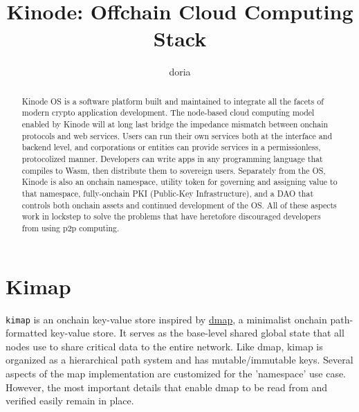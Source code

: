 \documentclass[runningheads]{llncs}
\begin{document}
%
\title{Kinode: Offchain Cloud Computing Stack}
%
%
\author{doria %
}
%
%
\institute{ }
%
\maketitle              %
%
\begin{abstract}
Kinode OS is a software platform built and maintained to integrate all the facets of modern crypto application development.
The node-based cloud computing model enabled by Kinode will at long last bridge the impedance mismatch between onchain protocols and web services.
Users can run their own services both at the interface and backend level, and corporations or entities can provide services in a permissionless, protocolized manner.
Developers can write apps in any programming language that compiles to Wasm, then distribute them to sovereign users.
Separately from the OS, Kinode is also an onchain namespace, utility token for governing and assigning value to that namespace, fully-onchain PKI (Public-Key Infrastructure), and a DAO that controls both onchain assets and continued development of the OS.
All of these aspects work in lockstep to solve the problems that have heretofore discouraged developers from using p2p computing.

\end{abstract}
%
%
%
\tableofcontents
\newpage
%
%
%
\section{Kimap}
\verb|kimap| is an onchain key-value store inspired by \href{https://github.com/dapphub/dmap}{dmap}, a minimalist onchain path-formatted key-value store.
It serves as the base-level shared global state that all nodes use to share critical data to the entire network.
Like dmap, kimap is organized as a hierarchical path system and has mutable/immutable keys.
Several aspects of the map implementation are customized for the 'namespace' use case.
However, the most important details that enable dmap to be read from and verified easily remain in place.
\end{document}
